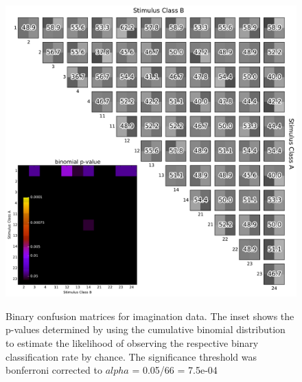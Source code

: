\begin{figure}[h] 
  \begin{center}
    \includegraphics[width=.75\textwidth,keepaspectratio=true]{Figures/model_W_binary_confusion_cond2}
   \\\vspace{-0.8em}
    \caption{Binary confusion matrices for imagination data.
    The inset shows the p-values determined by using the cumulative binomial distribution to estimate the likelihood of observing the respective binary classification rate by chance. The significance threshold was bonferroni corrected to $alpha$ =  0.05/66 = 7.5e-04}
    \label{fig:model_W_binary_confusion_cond2}
  \end{center}
  \vspace{-1em}
\end{figure}
\newpage
